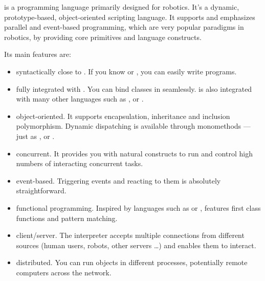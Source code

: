\us is a programming language primarily designed for robotics. It's a
dynamic, prototype-based, object-oriented scripting language. It
supports and emphasizes parallel and event-based programming, which
are very popular paradigms in robotics, by providing core primitives
and language constructs.

Its main features are:
\begin{itemize}
\item syntactically close to \Cxx. If you know \C or \Cxx, you can
  easily write \us programs.
\item fully integrated with \Cxx. You can bind \Cxx classes in \us
  seamlessly. \us is also integrated with many other languages such as
  \java, \matlab or \python.
\item object-oriented. It supports encapsulation, inheritance and
  inclusion polymorphism. Dynamic dispatching is available through
  monomethods --- just as \Cxx, \Cs or \java.
\item concurrent. It provides you with natural constructs to run and
  control high numbers of interacting concurrent tasks.
\item event-based. Triggering events and reacting to them is
  absolutely straightforward.
\item functional programming.  Inspired by languages such as \lisp or
  \caml, \us features first class functions and pattern matching.
\item client/server.  The interpreter accepts multiple connections
  from different sources (human users, robots, other servers \ldots)
  and enables them to interact.
\item distributed.  You can run objects in different processes,
  potentially remote computers across the network.
\end{itemize}

